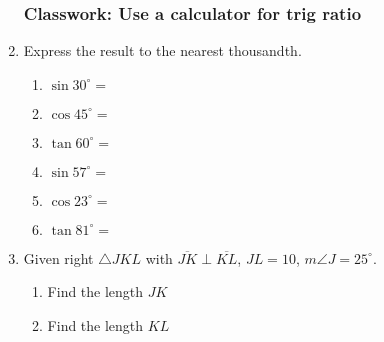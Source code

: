 \begin{enumerate}
\subsubsection*{Classwork: Use a calculator for trig ratio}
\item Express the result to the nearest thousandth.  \vspace{1cm}
\begin{multicols}{2}
  \begin{enumerate}
    \item $\sin 30^\circ = $ \vspace{1cm}
    \item $\cos 45^\circ =$ \vspace{1cm}
    \item $\tan 60^\circ =$
    \item $\sin 57^\circ = $ \vspace{1cm}
    \item $\cos 23^\circ =$ \vspace{1cm}
    \item $\tan 81^\circ =$
  \end{enumerate}
\end{multicols} \vspace{1cm}

\item Given right $\triangle JKL$ with $\overline{JK} \perp \overline{KL}$, $JL=10$, $m\angle J=25^\circ$.
  \begin{center}
     \vspace{1cm}
  \end{center}
  \begin{enumerate}
    \item Find the length $JK$\\[3cm]
    \item Find the length $KL$
  \end{enumerate}


\end{enumerate}

  